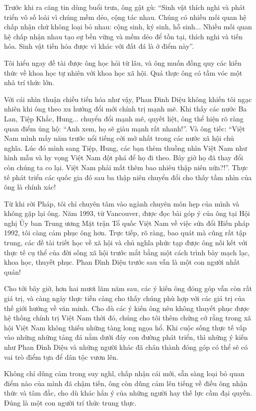 Trước khi ra căng tin dùng buổi trưa, ông gật gù: “Sinh vật thích nghi và phát triển vô số loài vì chúng mềm dẻo, cộng tác nhau. Chúng có nhiều mối quan hệ chấp nhận chứ không loại bỏ nhau: cộng sinh, ký sinh, hỗ sinh... Nhiều mối quan hệ chấp nhận nhau tạo sự bền vững và mềm dẻo để tồn tại, thích nghi và tiến hóa. Sinh vật tiến hóa được vì khác với đất đá là ở điểm này”.

Tôi hiểu ngay đề tài được ông học hỏi từ lâu, và ông muốn đồng quy các kiến thức về khoa học tự nhiên với khoa học xã hội. Quả thực ông có tầm vóc một nhà trí thức lớn.

Với cái nhìn thuận chiều tiến hóa như vậy, Phan Đình Diệu không khiến tôi ngạc nhiên khi ông theo xu hướng đổi mới chính trị mạnh mẽ. Khi thấy các nước Ba Lan, Tiệp Khắc, Hung... chuyển đổi mạnh mẽ, quyết liệt, ông thể hiện rõ ràng quan điểm ủng hộ: “Anh xem, họ sẽ giàu mạnh rất nhanh!”. Và ông tiếc: “Việt Nam mình mấy năm trước nổi tiếng cởi mở nhất trong các nước xã hội chủ nghĩa. Lúc đó mình sang Tiệp, Hung, các bạn thèm thuồng nhìn Việt Nam như hình mẫu và hy vọng Việt Nam đột phá để họ đi theo. Bây giờ họ đã thay đổi còn chúng ta co lại. Việt Nam phải mất thêm bao nhiêu thập niên nữa?!”. Thực tế phát triển các quốc gia đó sau ba thập niên chuyển đổi cho thấy tầm nhìn của ông là chính xác!

Từ khi rời Pháp, tôi chỉ chuyên tâm vào ngành chuyên môn hẹp của mình và không gặp lại ông. Năm 1993, từ Vancouver, được đọc bài góp ý của ông tại Hội nghị Ủy ban Trung ương Mặt trận Tổ quốc Việt Nam về việc sửa đổi Hiến pháp 1992, tôi càng cảm phục ông hơn. Trực tiếp, rõ ràng, bao quát mà cũng rất tập trung, các đề tài triết học về xã hội và chủ nghĩa phức tạp được ông nối kết với thực tế cụ thể của đời sống xã hội trước mắt bằng một cách trình bày mạch lạc, khoa học, thuyết phục. Phan Đình Diệu trước sau vẫn là một con người nhất quán!

Cho tới bây giờ, hơn hai mươi lăm năm sau, các ý kiến ông đóng góp vẫn còn rất giá trị, và càng ngày thực tiễn càng cho thấy chúng phù hợp với các giá trị của thế giới hướng về văn minh. Cho dù các ý kiến ông nêu không thuyết phục được hệ thống chính trị Việt Nam thời đó, chúng cho tôi thêm chứng cớ rằng trong xã hội Việt Nam không thiếu những tàng long ngọa hổ. Khi cuộc sống thực tế vấp vào những những tảng đá nằm dưới đáy con đường phát triển, thì những ý kiến như Phan Đình Diệu và những người khác đã chân thành đóng góp có thể sẽ có vai trò điểm tựa để dân tộc vươn lên.

Không chỉ dũng cảm trong suy nghĩ, chấp nhận cái mới, sẵn sàng loại bỏ quan điểm nào của mình đã chậm tiến, ông còn dũng cảm lên tiếng về điều ông nhận thức và tâm đắc, cho dù khác hẳn ý của những người hay thế lực cầm đại quyền. Đúng là một con người trí thức trung thực.

